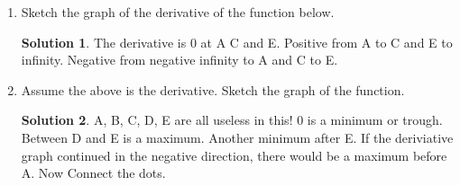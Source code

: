 \documentclass[10pt]{article}
\theoremstyle{Theorem}
\theoremstyle{definition}
\newtheorem*{solution}{Solution}
\theoremstyle{remark}
\theoremstyle{custom}
\begin{document}
\begin{enumerate}[1.]
\newpage
\item Sketch the graph of the derivative of the function below. 
\begin{solution}
The derivative is 0 at A C and E. Positive from A to C and E to infinity. Negative from negative infinity to A and C to E.
\end{solution}
\begin{center}
    \end{center}
\item Assume the above is the derivative. Sketch the graph of the function.
\begin{solution}
A, B, C, D, E are all useless in this! 0 is a minimum or trough. Between D and E is a maximum. Another minimum after E. If the deriviative graph continued in the negative direction, there would be a maximum before A. Now Connect the dots.
\end{solution}
\end{enumerate}
\end{document}
